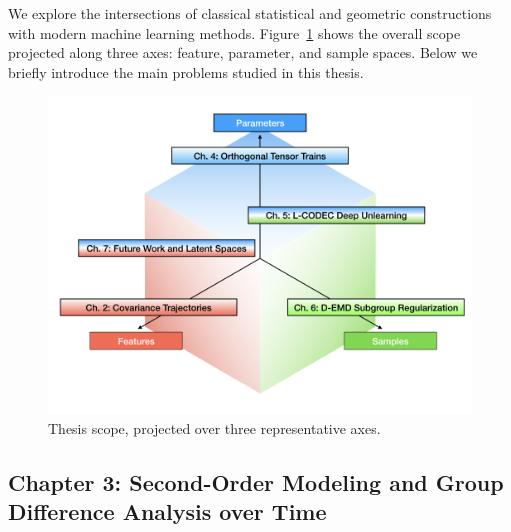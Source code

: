 We explore the intersections of classical statistical and geometric constructions with modern machine learning methods. 
Figure~\ref{fig:scope} shows the overall scope projected along three axes: feature, parameter, and sample spaces.
Below we briefly introduce the main problems studied in this thesis.
\begin{figure}[!ht]
    \centering
    \includegraphics[width=0.95\linewidth]{1_intro/thesis_scope_diss/thesis_scope_diss.png}
    \vspace{-10pt}
    \caption[Thesis scope]{Thesis scope, projected over three representative axes.}
    \label{fig:scope}
\end{figure}

\subsection{Chapter 3: Second-Order Modeling and Group Difference Analysis over Time}


